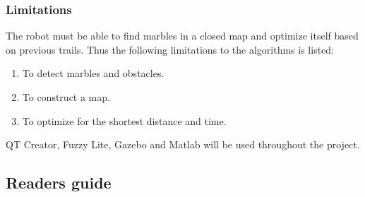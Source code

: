 \documentclass[../Head/Main.tex]{subfiles}
\begin{document}
\subsubsection{Limitations}
The robot must be able to find marbles in a closed map and optimize itself based on previous trails. Thus the following limitations to the algorithms is listed: 
\begin{enumerate}
    \item To detect marbles and obstacles.
    \item To construct a map.
    \item To optimize for the shortest distance and time.
\end{enumerate}
QT Creator, Fuzzy Lite, Gazebo and Matlab will be used throughout the project.

\subsection{Readers guide}
\end{document}
